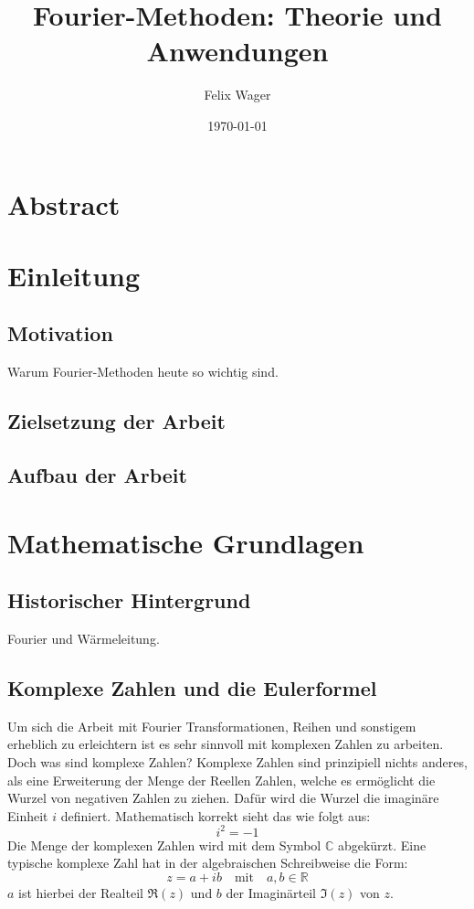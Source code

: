 \documentclass[a4paper,12pt]{article}
\title{Fourier-Methoden: Theorie und Anwendungen}
\author{Felix Wager}
\date{\today}
\begin{document}
\maketitle

\renewcommand{\contentsname}{Inhaltsverzeichnis}
\tableofcontents
\newpage

\section{Abstract}

\section{Einleitung}
\subsection{Motivation}
Warum Fourier-Methoden heute so wichtig sind.
\subsection{Zielsetzung der Arbeit}
\subsection{Aufbau der Arbeit}

\section{Mathematische Grundlagen}
\subsection{Historischer Hintergrund}
Fourier und Wärmeleitung.
\subsection{Komplexe Zahlen und die Eulerformel}
Um sich die Arbeit mit Fourier Transformationen, Reihen und sonstigem erheblich zu erleichtern ist es sehr sinnvoll mit komplexen Zahlen zu arbeiten. Doch was sind komplexe Zahlen? 
Komplexe Zahlen sind prinzipiell nichts anderes, als eine Erweiterung der Menge der Reellen Zahlen, welche es ermöglicht die Wurzel von negativen Zahlen zu ziehen. Dafür wird die Wurzel die imaginäre Einheit $i$ definiert. Mathematisch korrekt sieht das wie folgt aus:
$$i^2 = -1$$
Die Menge der komplexen Zahlen wird mit dem Symbol $\mathbb{C}$ abgekürzt. Eine typische komplexe Zahl hat in der algebraischen Schreibweise die Form:
$$ z = a + ib \quad \text{mit} \quad a,b \in \mathbb{R} $$
$a$ ist hierbei der Realteil $\Re(z)$ und $b$ der Imaginärteil $\Im(z)$ von $z$. \vspace{1em}
\end{document}
